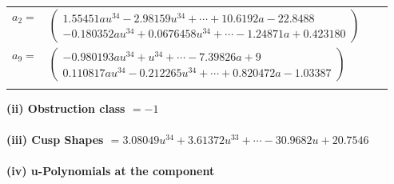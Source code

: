 \documentclass[1p]{elsarticle_modified}
\theoremstyle{definition}
\begin{document}
\begin{tabular}{m{7pt} m{180pt} m{7pt} m{180pt} }
\flushright $a_{2}=$&$\begin{pmatrix}1.55451 a u^{34}-2.98159 u^{34}+\cdots+10.6192 a-22.8488\\-0.180352 a u^{34}+0.0676458 u^{34}+\cdots-1.24871 a+0.423180\end{pmatrix}$ \\
\flushright $a_{9}=$&$\begin{pmatrix}-0.980193 a u^{34}+u^{34}+\cdots-7.39826 a+9\\0.110817 a u^{34}-0.212265 u^{34}+\cdots+0.820472 a-1.03387\end{pmatrix}$\\&\end{tabular}
\flushleft \textbf{(ii) Obstruction class $= -1$}\\~\\
\flushleft \textbf{(iii) Cusp Shapes $= 3.08049 u^{34}+3.61372 u^{33}+\cdots-30.9682 u+20.7546$}\\~\\
\newpage\renewcommand{\arraystretch}{1}
\flushleft \textbf{(iv) u-Polynomials at the component}\newline \\
\end{document}
